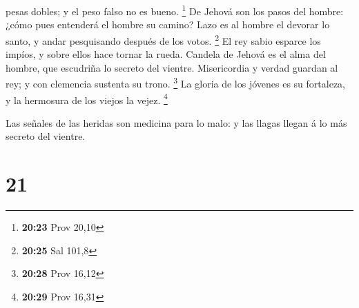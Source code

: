 pesas dobles; y el peso falso no es bueno. \footnote{\textbf{20:23} Prov
  20,10}  De Jehová son los pasos del hombre: ¿cómo pues
entenderá el hombre su camino?  Lazo es al hombre el
devorar lo santo, y andar pesquisando después de los votos. \footnote{\textbf{20:25}
  Sal 101,8}  El rey sabio esparce los impíos, y sobre
ellos hace tornar la rueda.  Candela de Jehová es el alma
del hombre, que escudriña lo secreto del vientre. 
Misericordia y verdad guardan al rey; y con clemencia sustenta su trono.
\footnote{\textbf{20:28} Prov 16,12}  La gloria de los
jóvenes es su fortaleza, y la hermosura de los viejos la vejez.
\footnote{\textbf{20:29} Prov 16,31}

 Las señales de las heridas son medicina para lo malo: y
las llagas llegan á lo más secreto del vientre.

\hypertarget{section-20}{%
\section{21}\label{section-20}}

